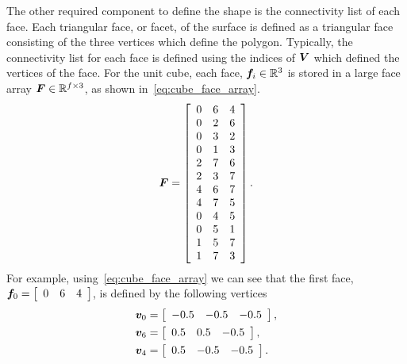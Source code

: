 The other required component to define the shape is the connectivity list of each face.
Each triangular face, or facet, of the surface is defined as a triangular face consisting of the three vertices which define the polygon.
Typically, the connectivity list for each face is defined using the indices of \( \bm{V} \) which defined the vertices of the face.
For the unit cube, each face, \( \bm{f}_i \in \mathbb{R}^3\) is stored in a large face array \( \bm{F} \in \mathbb{R}^{f \times 3}\), as shown in~\cref{eq:cube_face_array}.
\begin{align}\label{eq:cube_face_array}
    \bm{F} = 
    \begin{bmatrix}
        \begin{array}{ccc}
            0 & 6 & 4 \\
            0 & 2 & 6 \\
            0 & 3 & 2 \\
            0 & 1 & 3 \\
            2 & 7 & 6 \\
            2 & 3 & 7 \\
            4 & 6 & 7 \\
            4 & 7 & 5 \\
            0 & 4 & 5 \\
            0 & 5 & 1 \\
            1 & 5 & 7 \\
            1 & 7 & 3
        \end{array}
    \end{bmatrix}.
\end{align}
For example, using~\cref{eq:cube_face_array} we can see that the first face, \( \bm{f}_0 = \begin{bmatrix}\begin{array}{ccc} 0 & 6 & 4 \end{array}\end{bmatrix}\), is defined by the following vertices
\begin{align*}
    \bm{v}_0 &= \begin{bmatrix} \begin{array}{ccc} -0.5 & -0.5 & -0.5\end{array}\end{bmatrix},\\
    \bm{v}_6 &= \begin{bmatrix}\begin{array}{ccc} 0.5 & 0.5 & -0.5 \end{array}\end{bmatrix}, \\
    \bm{v}_4 &= \begin{bmatrix}\begin{array}{ccc}  0.5  & -0.5  & -0.5\end{array}\end{bmatrix}.
\end{align*}
